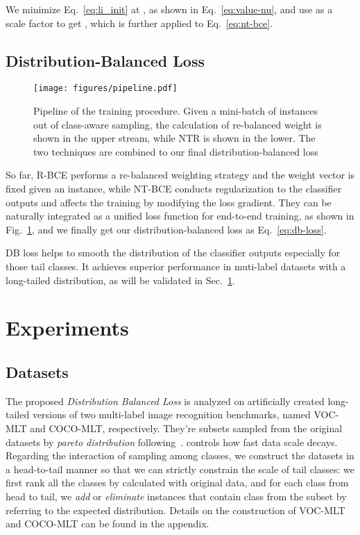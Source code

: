 \documentclass[runningheads]{llncs}
\begin{document}
 

We minimize Eq.~\ref{eq:li_init} at , as shown in Eq.~\ref{eq:value-nu}, and use  as a scale factor to get , which is further applied to Eq.~\ref{eq:nt-bce}. 

\subsection{Distribution-Balanced Loss}
\label{subsec:dbloss}

\begin{figure}[t]
    \centering
    \texttt{[image: figures/pipeline.pdf]}\caption{
        Pipeline of the training procedure. Given a mini-batch of instances out of class-aware sampling, 
        the calculation of re-balanced weight is shown in the upper stream, while NTR is shown in the lower. The two techniques are combined to our final distribution-balanced loss
}
    \label{fig:pipeline}
\end{figure}

So far, R-BCE performs a re-balanced weighting strategy and the weight vector is fixed given an instance, while NT-BCE conducts regularization to the classifier outputs and affects the training by modifying the loss gradient. They can be naturally integrated as a unified loss function for end-to-end training, as shown in Fig.~\ref{fig:pipeline}, and we finally get our distribution-balanced loss as Eq.~\ref{eq:db-loss}.


DB loss helps to smooth the distribution of the classifier outputs especially for those tail classes. It achieves superior performance in muti-label datasets with a long-tailed distribution, as will be validated in Sec.~\ref{sec:experiment}. 

\section{Experiments}
\label{sec:experiment}

\subsection{Datasets}
The proposed \textit{Distribution Balanced Loss} is analyzed on artificially created long-tailed versions of two multi-label image recognition benchmarks, named VOC-MLT and COCO-MLT, respectively. 
They're subsets sampled from the original datasets by \textit{pareto distribution}  following~\cite{liu2019largescale}.  controls how fast data scale decays.
Regarding the interaction of sampling among classes, we construct the datasets in a head-to-tail manner so that we can strictly constrain the scale of tail classes:
we first rank all the classes by  calculated with original data, and for each class  from head to tail, we \textit{add} or \textit{eliminate} instances that contain class  from the subset by referring to the expected distribution.
Details on the construction of VOC-MLT and COCO-MLT can be found in the appendix.
\end{document}
